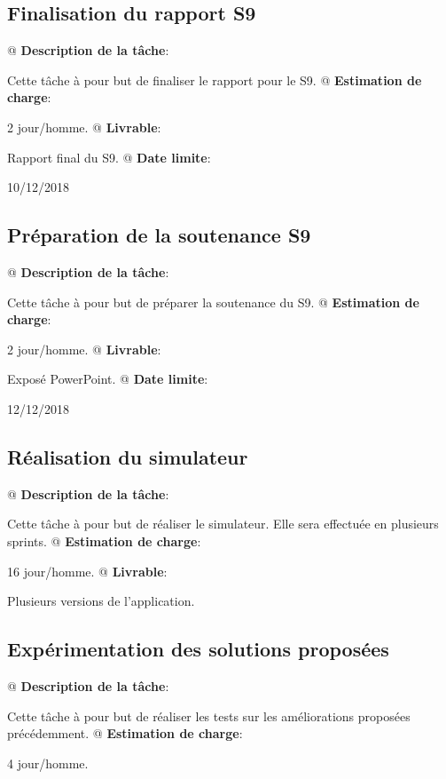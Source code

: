 \documentclass[final]{polytech/polytech}
\begin{document}
		\subsection{Finalisation du rapport S9}
			\begin{easylist}
				@ \textbf{Description de la tâche}:
				
				Cette tâche à pour but de finaliser le rapport pour le S9.
				@ \textbf{Estimation de charge}:
				
				2 jour/homme.
				@ \textbf{Livrable}:
				
				Rapport final du S9.
				@ \textbf{Date limite}:
				
				10/12/2018
			\end{easylist}
			
		\subsection{Préparation de la soutenance S9}
			\begin{easylist}
				@ \textbf{Description de la tâche}:
				
				Cette tâche à pour but de préparer la soutenance du S9.
				@ \textbf{Estimation de charge}:
				
				2 jour/homme.
				@ \textbf{Livrable}:
				
				Exposé PowerPoint.
				@ \textbf{Date limite}:
				
				12/12/2018
			\end{easylist}
			
		\subsection{Réalisation du simulateur}
			\begin{easylist}
				@ \textbf{Description de la tâche}:
				
				Cette tâche à pour but de réaliser le simulateur.
				Elle sera effectuée en plusieurs sprints.
				@ \textbf{Estimation de charge}:
				
				16 jour/homme.
				@ \textbf{Livrable}:
				
				Plusieurs versions de l'application.
			\end{easylist}
			
		\subsection{Expérimentation des solutions proposées}
			\begin{easylist}
				@ \textbf{Description de la tâche}:
				
				Cette tâche à pour but de réaliser les tests sur les améliorations proposées précédemment.			
				@ \textbf{Estimation de charge}:
				
				4 jour/homme.
			\end{easylist}
			
\end{document}
